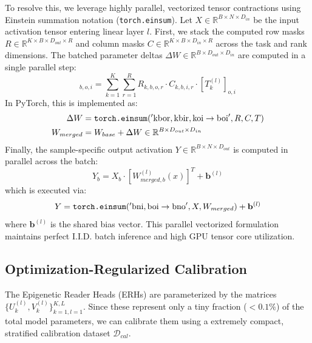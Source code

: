 To resolve this, we leverage highly parallel, vectorized tensor contractions using Einstein summation notation (\texttt{torch.einsum}). Let $X \in \mathbb{R}^{B \times N \times D_{in}}$ be the input activation tensor entering linear layer $l$. 
First, we stack the computed row masks $R \in \mathbb{R}^{K \times B \times D_{out} \times R}$ and column masks $C \in \mathbb{R}^{K \times B \times D_{in} \times R}$ across the task and rank dimensions. The batched parameter deltas $\Delta W \in \mathbb{R}^{B \times D_{out} \times D_{in}}$ are computed in a single parallel step:
\begin{equation}
    [\Delta W]_{b, o, i} = \sum_{k=1}^K \sum_{r=1}^R R_{k, b, o, r} \cdot C_{k, b, i, r} \cdot [T_k^{(l)}]_{o, i}
\end{equation}
In PyTorch, this is implemented as:
\begin{align*}
    \Delta W &= \text{\texttt{torch.einsum}}('\text{kbor},\text{kbir},\text{koi}\rightarrow\text{boi}', R, C, T) \\
    W_{merged} &= W_{base} + \Delta W \in \mathbb{R}^{B \times D_{out} \times D_{in}}
\end{align*}
Finally, the sample-specific output activation $Y \in \mathbb{R}^{B \times N \times D_{out}}$ is computed in parallel across the batch:
\begin{equation}
    Y_b = X_b \cdot [W_{merged, b}^{(l)}(x)]^T + \mathbf{b}^{(l)}
\end{equation}
which is executed via:
\begin{equation}
    Y = \text{\texttt{torch.einsum}}('\text{bni},\text{boi}\rightarrow\text{bno}', X, W_{merged}) + \mathbf{b}^{(l)}
\end{equation}
where $\mathbf{b}^{(l)}$ is the shared bias vector. This parallel vectorized formulation maintains perfect I.I.D. batch inference and high GPU tensor core utilization.

\subsection{Optimization-Regularized Calibration}
The Epigenetic Reader Heads (ERHs) are parameterized by the matrices $\{U_k^{(l)}, V_k^{(l)}\}_{k=1, l=1}^{K, L}$. Since these represent only a tiny fraction ($<0.1\%$) of the total model parameters, we can calibrate them using a extremely compact, stratified calibration dataset $\mathcal{D}_{cal}$.


